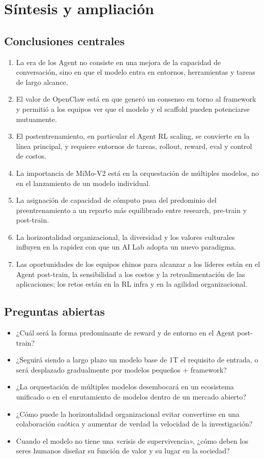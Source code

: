 \section{Síntesis y ampliación}

\subsection{Conclusiones centrales}

\begin{enumerate}
\item La era de los Agent no consiste en una mejora de la capacidad de conversación, sino en que el modelo entra en entornos, herramientas y tareas de largo alcance.
\item El valor de OpenClaw está en que generó un consenso en torno al framework y permitió a los equipos ver que el modelo y el scaffold pueden potenciarse mutuamente.
\item El postentrenamiento, en particular el Agent RL scaling, se convierte en la línea principal, y requiere entornos de tareas, rollout, reward, eval y control de costos.
\item La importancia de MiMo-V2 está en la orquestación de múltiples modelos, no en el lanzamiento de un modelo individual.
\item La asignación de capacidad de cómputo pasa del predominio del preentrenamiento a un reparto más equilibrado entre research, pre-train y post-train.
\item La horizontalidad organizacional, la diversidad y los valores culturales influyen en la rapidez con que un AI Lab adopta un nuevo paradigma.
\item Las oportunidades de los equipos chinos para alcanzar a los líderes están en el Agent post-train, la sensibilidad a los costos y la retroalimentación de las aplicaciones; los retos están en la RL infra y en la agilidad organizacional.
\end{enumerate}

\subsection{Preguntas abiertas}

\begin{itemize}
\item ¿Cuál será la forma predominante de reward y de entorno en el Agent post-train?
\item ¿Seguirá siendo a largo plazo un modelo base de 1T el requisito de entrada, o será desplazado gradualmente por modelos pequeños + framework?
\item ¿La orquestación de múltiples modelos desembocará en un ecosistema unificado o en el enrutamiento de modelos dentro de un mercado abierto?
\item ¿Cómo puede la horizontalidad organizacional evitar convertirse en una colaboración caótica y aumentar de verdad la velocidad de la investigación?
\item Cuando el modelo no tiene una «crisis de supervivencia», ¿cómo deben los seres humanos diseñar su función de valor y su lugar en la sociedad?
\end{itemize}

